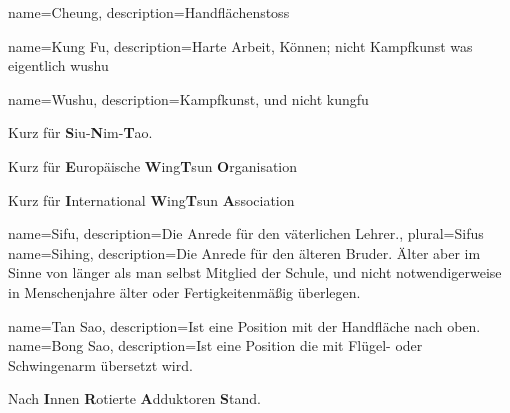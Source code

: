 







{
  name=Cheung,
  description={Handfl\"achenstoss}
}

{
  name=Kung Fu,
  description={Harte Arbeit, K\"onnen; nicht Kampfkunst was eigentlich wushu}
}



{
  name=Wushu,
  description={Kampfkunst, und nicht kungfu}
}


	{Kurz f\"ur \textbf{S}iu-\textbf{N}im-\textbf{T}ao.}

	{Kurz f\"ur \textbf{E}urop\"aische \textbf{W}ing\textbf{T}sun \textbf{O}rganisation}

	{Kurz f\"ur \textbf{I}nternational \textbf{W}ing\textbf{T}sun \textbf{A}ssociation}




{
  name=Sifu,
  description={Die Anrede f\"ur den v\"aterlichen Lehrer.},
  plural=Sifus
}
{
  name=Sihing,
  description={Die Anrede f\"ur den \"alteren Bruder. \"Alter aber im Sinne von l\"anger als man selbst Mitglied der Schule, und nicht notwendigerweise in Menschenjahre \"alter oder Fertigkeitenm\"a{\ss}ig \"uberlegen.}
}


{
  name=Tan Sao,
  description={Ist eine Position mit der Handfl\"ache nach oben.}
}
{
  name=Bong Sao,
  description={Ist eine Position die mit Fl\"ugel- oder Schwingenarm \"ubersetzt wird.}
}

	{Nach \textbf{I}nnen \textbf{R}otierte \textbf{A}dduktoren \textbf{S}tand.}